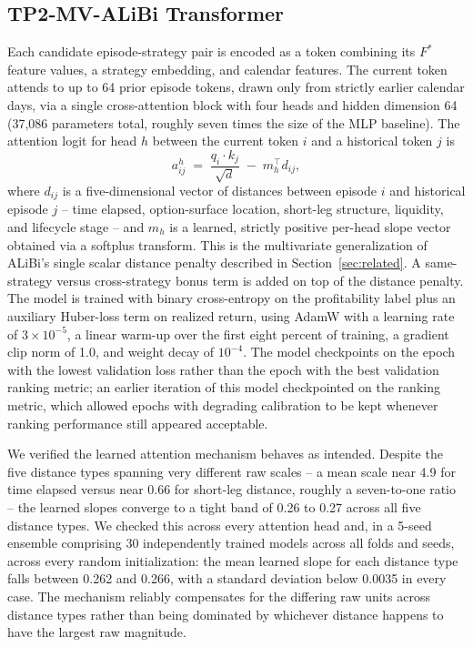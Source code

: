 \documentclass[sigconf,review,anonymous]{acmart}
\begin{document}
\subsection{TP2-MV-ALiBi Transformer}
\label{sec:transformer}
Each candidate episode-strategy pair is encoded as a token combining its $F^{\ast}$ feature values, a strategy embedding, and calendar features. The current token attends to up to 64 prior episode tokens, drawn only from strictly earlier calendar days, via a single cross-attention block with four heads and hidden dimension 64 (37{,}086 parameters total, roughly seven times the size of the MLP baseline). The attention logit for head $h$ between the current token $i$ and a historical token $j$ is
\[
a_{ij}^{h} \;=\; \frac{q_i \cdot k_j}{\sqrt{d}} \;-\; m_h^{\top} d_{ij},
\]
where $d_{ij}$ is a five-dimensional vector of distances between episode $i$ and historical episode $j$ -- time elapsed, option-surface location, short-leg structure, liquidity, and lifecycle stage -- and $m_h$ is a learned, strictly positive per-head slope vector obtained via a softplus transform. This is the multivariate generalization of ALiBi's single scalar distance penalty described in Section~\ref{sec:related}. A same-strategy versus cross-strategy bonus term is added on top of the distance penalty. The model is trained with binary cross-entropy on the profitability label plus an auxiliary Huber-loss term on realized return, using AdamW with a learning rate of $3\times10^{-5}$, a linear warm-up over the first eight percent of training, a gradient clip norm of 1.0, and weight decay of $10^{-4}$. The model checkpoints on the epoch with the lowest validation loss rather than the epoch with the best validation ranking metric; an earlier iteration of this model checkpointed on the ranking metric, which allowed epochs with degrading calibration to be kept whenever ranking performance still appeared acceptable.

We verified the learned attention mechanism behaves as intended. Despite the five distance types spanning very different raw scales -- a mean scale near 4.9 for time elapsed versus near 0.66 for short-leg distance, roughly a seven-to-one ratio -- the learned slopes converge to a tight band of 0.26 to 0.27 across all five distance types. We checked this across every attention head and, in a 5-seed ensemble comprising 30 independently trained models across all folds and seeds, across every random initialization: the mean learned slope for each distance type falls between 0.262 and 0.266, with a standard deviation below 0.0035 in every case. The mechanism reliably compensates for the differing raw units across distance types rather than being dominated by whichever distance happens to have the largest raw magnitude.
\end{document}
